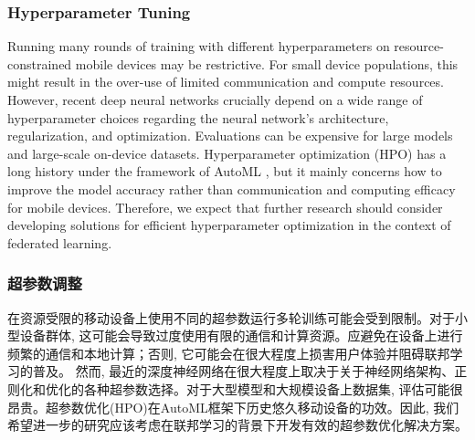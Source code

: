 \subsubsection{Hyperparameter Tuning}
Running many rounds of training with different hyperparameters on resource-constrained mobile devices may be restrictive. For small device populations, this might result in the over-use of limited communication and compute resources. %
%
However, recent deep neural networks crucially depend on a wide range of hyperparameter choices regarding the neural network’s architecture, regularization, and optimization. Evaluations can be  expensive for large models and large-scale on-device datasets. Hyperparameter optimization (HPO) has a long history under the framework of AutoML \cite{ripley1993statistical,king1995statlog,kohavi1995automatic}, but it mainly concerns how to improve the model accuracy \cite{bergstra2011algorithms,snoek2015scalable,pedregosa2016hyperparameter,falkner2018bohb} rather than communication and computing efficacy for mobile devices. Therefore, we expect that further research should consider developing solutions for efficient hyperparameter optimization in the context of federated learning.



\subsubsection*{超参数调整}
在资源受限的移动设备上使用不同的超参数运行多轮训练可能会受到限制。对于小型设备群体, 这可能会导致过度使用有限的通信和计算资源。应避免在设备上进行频繁的通信和本地计算；否则, 它可能会在很大程度上损害用户体验并阻碍联邦学习的普及。
%
然而, 最近的深度神经网络在很大程度上取决于关于神经网络架构、正则化和优化的各种超参数选择。对于大型模型和大规模设备上数据集, 评估可能很昂贵。超参数优化(HPO)在AutoML框架下历史悠久移动设备的功效。因此, 我们希望进一步的研究应该考虑在联邦学习的背景下开发有效的超参数优化解决方案。



